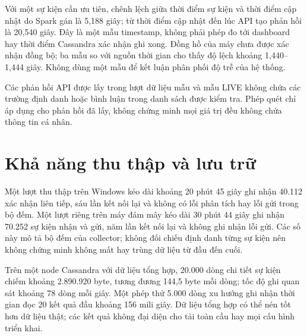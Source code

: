 Với một sự kiện cần ưu tiên, chênh lệch giữa thời điểm sự kiện và thời điểm cập nhật do Spark gán là 5,188 giây; từ thời điểm cập nhật đến lúc API tạo phản hồi là 20,540 giây. Đây là một mẫu timestamp, không phải phép đo tới dashboard hay thời điểm Cassandra xác nhận ghi xong. Đồng hồ của máy chưa được xác nhận đồng bộ; ba mẫu so với nguồn thời gian cho thấy độ lệch khoảng 1,440--1,444 giây. Không dùng một mẫu để kết luận phân phối độ trễ của hệ thống.

Các phản hồi API được lấy trong lượt dữ liệu mẫu và mẫu LIVE không chứa các trường định danh hoặc bình luận trong danh sách được kiểm tra. Phép quét chỉ áp dụng cho phản hồi đã lấy, không chứng minh mọi giá trị đều không chứa thông tin cá nhân.
\section{Khả năng thu thập và lưu trữ}
Một lượt thu thập trên Windows kéo dài khoảng 20 phút 45 giây ghi nhận 40.112 xác nhận liên tiếp, sáu lần kết nối lại và không có lỗi phân tích hay lỗi gửi trong bộ đếm. Một lượt riêng trên máy đám mây kéo dài 30 phút 44 giây ghi nhận 70.252 sự kiện nhận và gửi, năm lần kết nối lại và không ghi nhận lỗi gửi. Các số này mô tả bộ đếm của collector; không đối chiếu định danh từng sự kiện nên không chứng minh không mất hay trùng dữ liệu từ đầu đến cuối.

Trên một node Cassandra với dữ liệu tổng hợp, 20.000 dòng chi tiết sự kiện chiếm khoảng 2.890.920 byte, tương đương 144,5 byte mỗi dòng; tốc độ ghi quan sát khoảng 78 dòng mỗi giây. Một phép thử 5.000 dòng xu hướng ghi nhận thời gian đọc 20 kết quả đầu khoảng 156 mili giây. Dữ liệu tổng hợp có thể nén tốt hơn dữ liệu thật; các kết quả không đại diện cho tải toàn cầu hay mọi cấu hình triển khai.
